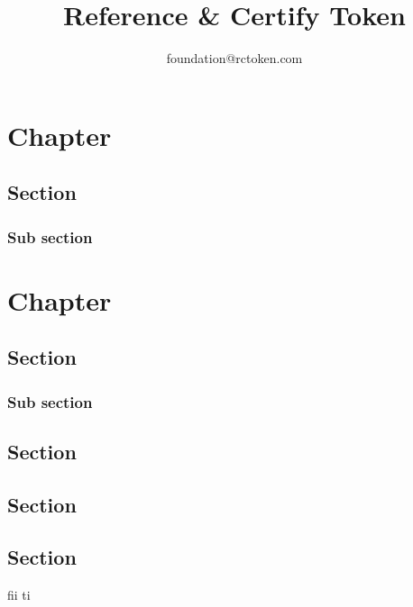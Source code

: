 \documentclass[oneside,openany]{tufte-book}
\title{Reference \& Certify Token}
\author{foundation@rctoken.com}
\begin{document}
\maketitle
\tableofcontents






\chapter{Chapter}
\lipsum[1]
\section{Section}
\lipsum[1]
\subsection{Sub section}
\lipsum[2]

\chapter{Chapter}
\lipsum[3]
\section{Section}
\lipsum[4]
\subsection{Sub section}
\lipsum[5]
\section{Section}
\lipsum[7]
\section{Section}
\lipsum[8]
\section{Section}
\lipsum[9]
\lipsum[10]
\lipsum[11]


fii ti 

\begin{quote}
\end{quote}
\end{document}
